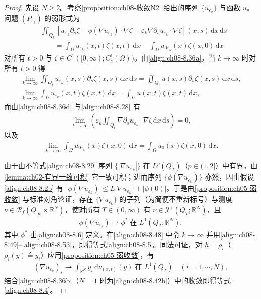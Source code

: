 \documentclass[../../main.tex]{subfiles}%
\begin{document}
\begin{proof}
先设 $N\geqslant2$。考察\cref{proposition:ch08-收敛N2} 给出的序列 $\{u_{\varepsilon_k}\}$ 与函数 $u$。问题 $(P_{\varepsilon_k})$ 的弱形式为
\begin{align}
&\iint_{Q_t}[u_{\varepsilon_k}\partial_s\zeta-\phi(\nabla u_{\varepsilon_k})\cdot\nabla\zeta-\varepsilon_k\nabla\partial_su_{\varepsilon_k}\cdot\nabla\zeta](x,s)\,\mathrm{d}x\,\mathrm{d}s\nonumber\\
&\qquad=\int_\Omega u_{\varepsilon_k}(x,t)\zeta(x,t)\,\mathrm{d}x-\int_\Omega u_{0\varepsilon_k}(x)\zeta(x,0)\,\mathrm{d}x \label{align:ch08-8.48}
\end{align}
对所有 $t>0$ 与 $\zeta\in C^1([0,\infty);C^1_c(\Omega))$。由\eqref{align:ch08-8.36a}，当 $k\to\infty$ 时对所有 $t>0$ 得
\begin{align}
\lim_{k\to\infty}\iint_{Q_t}u_{\varepsilon_k}(x,s)\partial_s\zeta(x,s)\,\mathrm{d}x\,\mathrm{d}s
=\iint_{Q_t}u(x,s)\partial_s\zeta(x,s)\,\mathrm{d}x\,\mathrm{d}s, \label{align:ch08-8.49}\\
\lim_{k\to\infty}\int_\Omega u_{\varepsilon_k}(x,t)\zeta(x,t)\,\mathrm{d}x
=\int_\Omega u(x,t)\zeta(x,t)\,\mathrm{d}x, \label{align:ch08-8.50}
\end{align}
而由\eqref{align:ch08-8.36d} 与\eqref{align:ch08-8.28} 有
\begin{align}
\lim_{k\to\infty}\left(\varepsilon_k\iint_{Q_t}\nabla\partial_s u_{\varepsilon_k}\cdot\nabla\zeta\,\mathrm{d}x\,\mathrm{d}s\right)=0, \label{align:ch08-8.51}
\end{align}
以及
\begin{align}
\lim_{k\to\infty}\int_\Omega u_{0\varepsilon_k}(x)\zeta(x,0)\,\mathrm{d}x
=\int_\Omega u_0(x)\zeta(x,0)\,\mathrm{d}x. \label{align:ch08-8.52}
\end{align}

由于由不等式\eqref{align:ch08-8.29} 序列 $\{|\nabla u_{\varepsilon_k}|\}$ 在 $L^p(Q_T)$（$p\in(1,2]$）中有界，由\cref{lemma:ch02-有界一致可积} 它一致可积；进而序列 $\{\phi(\nabla u_{\varepsilon_k})\}$ 亦然，因由假设\eqref{align:ch08-8.2b} 有 $|\phi(\nabla u_{\varepsilon_k})|\leqslant L|\nabla u_{\varepsilon_k}|+|\phi(0)|$。于是由\cref{proposition:ch05-弱收敛} 与标准对角论证，存在 $\{\nabla u_{\varepsilon_k}\}$ 的子列（为简便不重新标号）与测度 $\nu\in\mathscr{R}_f(Q_\infty\times\mathbb{R}^N)$，使对所有 $T\in(0,\infty)$ 有 $\nu\in\mathcal{Y}^+(Q_T;\mathbb{R}^N)$，且
\begin{align}
\phi(\nabla u_{\varepsilon_k})\rightharpoonup\phi^*\ \text{在 }L^1(Q_T;\mathbb{R}^N), \label{align:ch08-8.53}
\end{align}
其中 $\phi^*$ 由\eqref{align:ch08-8.6} 定义。在\eqref{align:ch08-8.48} 中令 $k\to\infty$ 并用\eqref{align:ch08-8.49}--\eqref{align:ch08-8.53}，即得等式\eqref{align:ch08-8.5}。同法可证，对 $h=\rho_i$（$\rho_i(y)\triangleq y_i$）应用\cref{proposition:ch05-弱收敛}，有
\begin{align*}
(\nabla u_{\varepsilon_k})_i\rightharpoonup\int_{\mathbb{R}^N}y_i\,\mathrm{d}\nu_{(x,t)}(y)\ \text{在 }L^1(Q_T)\quad(i=1,\cdots ,N),
\end{align*}
结合\eqref{align:ch08-8.36b}（$N=1$ 时为\eqref{align:ch08-8.42b}）中的收敛即得等式\eqref{align:ch08-8.4}。


\end{proof}
\end{document}

